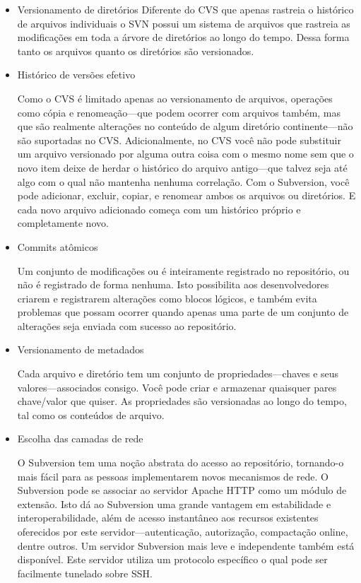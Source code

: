   \begin{itemize}
  \item Versionamento de diretórios
  Diferente do CVS que apenas rastreia o histórico de arquivos individuais o SVN possui um sistema de arquivos que rastreia as modificações em toda a árvore de diretórios ao longo do tempo. Dessa forma tanto os arquivos quanto os diretórios são versionados.

  \item Histórico de versões efetivo

  Como o CVS é limitado apenas ao versionamento de arquivos, operações como cópia e renomeação—que podem ocorrer com arquivos também, mas que são realmente alterações no conteúdo de algum diretório continente—não são suportadas no CVS. Adicionalmente, no CVS você não pode substituir um arquivo versionado por alguma outra coisa com o mesmo nome sem que o novo item deixe de herdar o histórico do arquivo antigo—que talvez seja até algo com o qual não mantenha nenhuma correlação. Com o Subversion, você pode adicionar, excluir, copiar, e renomear ambos os arquivos ou diretórios. E cada novo arquivo adicionado começa com um histórico próprio e completamente novo.

  \item Commits atômicos

  Um conjunto de modificações ou é inteiramente registrado no repositório, ou não é registrado de forma nenhuma. Isto possibilita aos desenvolvedores criarem e registrarem alterações como blocos lógicos, e também evita problemas que possam ocorrer quando apenas uma parte de um conjunto de alterações seja enviada com sucesso ao repositório.

  \item Versionamento de metadados

  Cada arquivo e diretório tem um conjunto de propriedades—chaves e seus valores—associados consigo. Você pode criar e armazenar quaisquer pares chave/valor que quiser. As propriedades são versionadas ao longo do tempo, tal como os conteúdos de arquivo.

  \item Escolha das camadas de rede

  O Subversion tem uma noção abstrata do acesso ao repositório, tornando-o mais fácil para as pessoas implementarem novos mecanismos de rede. O Subversion pode se associar ao servidor Apache HTTP como um módulo de extensão. Isto dá ao Subversion uma grande vantagem em estabilidade e interoperabilidade, além de acesso instantâneo aos recursos existentes oferecidos por este servidor—autenticação, autorização, compactação online, dentre outros. Um servidor Subversion mais leve e independente também está disponível. Este servidor utiliza um protocolo específico o qual pode ser facilmente tunelado sobre SSH.


\end{itemize}
